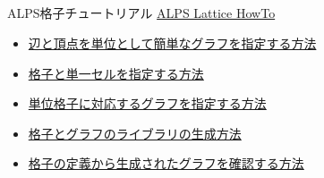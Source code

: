 \subsection*{\redm\whiteb\greenb}
\begin{frame}[t,fragile]{ALPS格子チュートリアル}
  \href{http://alps.comp-phys.org/mediawiki/index.php/Tutorials:LatticeHOWTO/ja}{ALPS Lattice HowTo} \\
  \begin{itemize}
    \item \href{http://alps.comp-phys.org/mediawiki/index.php/Tutorials:LatticeHOWTO:SimpleGraphs/ja}{辺と頂点を単位として簡単なグラフを指定する方法}
    \item \href{http://alps.comp-phys.org/mediawiki/index.php/Tutorials:LatticesAndUnitCells/ja}{格子と単一セルを指定する方法}
    \item \href{http://alps.comp-phys.org/mediawiki/index.php/Tutorials:LatticesAndGraphs/ja}{単位格子に対応するグラフを指定する方法}
    \item \href{http://alps.comp-phys.org/mediawiki/index.php/Tutorials:LatticeHOWTO:Library/ja}{格子とグラフのライブラリの生成方法}
    \item \href{http://alps.comp-phys.org/mediawiki/index.php/Tutorials:LatticeHowto:CheckLattice/ja}{格子の定義から生成されたグラフを確認する方法}
  \end{itemize}
\end{frame}


